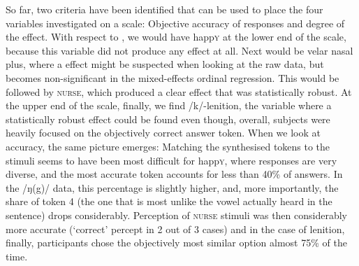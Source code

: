 So far, two criteria have been identified that can be used to place the four variables investigated on a scale: Objective accuracy of responses and degree of the  effect.
With respect to , we would have happ\textsc{y} at the lower end of the scale, because this variable did not produce any  effect at all.
Next would be velar nasal plus, where a  effect might be suspected when looking at the raw data, but becomes non-significant in the mixed-effects ordinal regression.
This would be followed by \textsc{nurse}, which produced a clear  effect that was statistically robust.
At the upper end of the scale, finally, we find /k/-lenition, the variable where a statistically robust  effect could be found even though, overall, subjects were heavily focused on the objectively correct answer token.
When we look at accuracy, the same picture emerges:
Matching the synthesised tokens to the stimuli seems to have been most difficult for happ\textsc{y}, where responses are very diverse, and the most accurate token accounts for less than 40\% of answers.
In the /ŋ(g)/ data, this percentage is slightly higher, and, more importantly, the share of token 4 (the one that is most unlike the vowel actually heard in the sentence) drops considerably.
Perception of \textsc{nurse} stimuli was then considerably more accurate (`correct' percept in 2 out of 3 cases) and in the case of lenition, finally, participants chose the objectively most similar option almost 75\% of the time.

